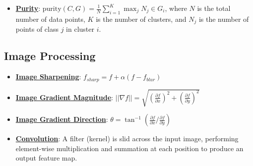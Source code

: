 \documentclass{article}%
\begin{document}
\begin{itemize}[leftmargin=*]
\item \href{https://purdue.brightspace.com/d2l/common/assets/pdfjs-d2l-dist/1.0.14-legacy/web/viewer.html?file=\%2Fcontent\%2Fenforced\%2F1095467-wl.202510.CS.24300.001\%2F12L2-distance-clusters.pdf\%3Fou\%3D1095467\&lang=en-us\&container=d2l-fileviewer-rendered-pdf\&fullscreen=d2l-fileviewer-rendered-pdf-dialog\&height=667#page=44}{\textbf{Purity}}: $\text{purity}(C, G) = \frac{1}{N} \sum_{i=1}^{K} \max_j N_j \in G_i$, where $N$ is the total number of data points, $K$ is the number of clusters, and $N_j$ is the number of points of class $j$ in cluster $i$.%
\end{itemize}

%
\subsection{Image Processing}%
\label{subsec:ImageProcessing}%
\begin{itemize}[leftmargin=*]%
\item \href{https://purdue.brightspace.com/d2l/common/assets/pdfjs-d2l-dist/1.0.14-legacy/web/viewer.html?file=\%2Fcontent\%2Fenforced\%2F1095467-wl.202510.CS.24300.001\%2F07L2-Vision.pdf\%3Fou\%3D1095467\&lang=en-us\&container=d2l-fileviewer-rendered-pdf\&fullscreen=d2l-fileviewer-rendered-pdf-dialog\&height=667#page=55}{\textbf{Image Sharpening}}: $f_{sharp} = f + \alpha(f − f_{blur})$%
\item \href{https://purdue.brightspace.com/d2l/common/assets/pdfjs-d2l-dist/1.0.14-legacy/web/viewer.html?file=\%2Fcontent\%2Fenforced\%2F1095467-wl.202510.CS.24300.001\%2F08L2-Feature Extraction.pdf\%3Fou\%3D1095467\&lang=en-us\&container=d2l-fileviewer-rendered-pdf\&fullscreen=d2l-fileviewer-rendered-pdf-dialog\&height=667#page=17}{\textbf{Image Gradient Magnitude}}: $||\nabla f|| = \sqrt{(\frac{\partial f}{\partial x})^2 + (\frac{\partial f}{\partial y})^2}$%
\item \href{https://purdue.brightspace.com/d2l/common/assets/pdfjs-d2l-dist/1.0.14-legacy/web/viewer.html?file=\%2Fcontent\%2Fenforced\%2F1095467-wl.202510.CS.24300.001\%2F08L2-Feature Extraction.pdf\%3Fou\%3D1095467\&lang=en-us\&container=d2l-fileviewer-rendered-pdf\&fullscreen=d2l-fileviewer-rendered-pdf-dialog\&height=667#page=34}{\textbf{Image Gradient Direction}}: $\theta = \tan^{-1}(\frac{\partial f}{\partial x} / \frac{\partial f}{\partial y})$%
\item \href{https://purdue.brightspace.com/d2l/common/assets/pdfjs-d2l-dist/1.0.14-legacy/web/viewer.html?file=\%2Fcontent\%2Fenforced\%2F1095467-wl.202510.CS.24300.001\%2F09L1-cnn.pdf\%3Fou\%3D1095467\&lang=en-us\&container=d2l-fileviewer-rendered-pdf\&fullscreen=d2l-fileviewer-rendered-pdf-dialog\&height=667#page=6}{\textbf{Convolution}}: A filter (kernel) is slid across the input image, performing element-wise multiplication and summation at each position to produce an output feature map.%
\end{itemize}
\end{document}
